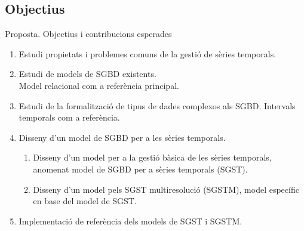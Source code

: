 \subsection{Objectius}
\begin{frame}{Proposta. Objectius i contribucions esperades}


\begin{enumerate}

  \item Estudi  propietats i problemes comuns de la gestió de sèries temporals.

  \item Estudi de models de SGBD existents.  \\
    Model relacional com a referència principal.

  \item Estudi de la formalització de tipus de dades complexos als
    SGBD. Intervals temporals com a
    referència.

  \item Disseny d'un model de SGBD per a les sèries temporals. 

    \begin{enumerate}
    \item Disseny d'un model per a la gestió bàsica de les sèries
      temporals, anomenat model de SGBD per a sèries temporals (SGST).

    \item Disseny d'un model pels SGST multiresolució (SGSTM), model
      específic en base del model de SGST.
    \end{enumerate}

  \item Implementació de referència dels models de SGST i SGSTM. 

\end{enumerate}

\end{frame}




